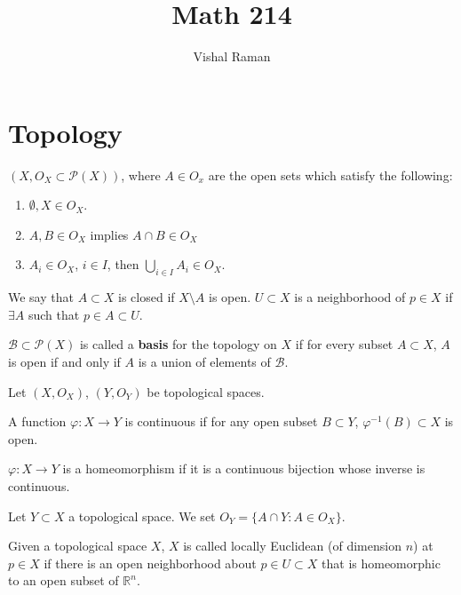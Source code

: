 \documentclass[12pt]{scrartcl}
\newcommand{\R}{\mathbb{R}}
\let \phi \varphi
\let \mc \mathcal
\begin{document}
\title{Math 214}
\author{Vishal Raman}
\maketitle
\tableofcontents
\newpage
\section{Topology}
\begin{definition} $(X, O_X \subset \mc P(X))$, where $A \in O_x$ are the open sets which satisfy the following:
\begin{enumerate}
\item $\emptyset, X \in O_X$.
\item $A, B \in O_X$ implies $A \cap B \in O_X$
\item $A_i \in O_X$, $i \in I$, then $\bigcup_{i \in I} A_i \in O_X$.
\end{enumerate}
We say that $A \subset X$ is closed if $X \setminus A$ is open.  $U \subset X$ is a neighborhood of $p \in X$ if $\exists A$ such that $p \in A \subset U$.
\end{definition}

\begin{definition}  $\mc B \subset \mc P(X)$ is called a \textbf{basis} for the topology on $X$ if for every subset $A \subset X$, $A$ is open if and only if $A$ is a union of elements of $\mc B$.
\end{definition}

Let $(X, O_X)$, $(Y, O_Y)$ be topological spaces.  

\begin{definition} A function $\phi : X \to Y$ is continuous if for any open subset $B \subset Y$, $\phi^{-1}(B) \subset X$ is open.  
\end{definition}

\begin{definition} $\phi: X \to Y$ is a homeomorphism if it is a continuous bijection whose inverse is continuous.  
\end{definition}

\begin{definition} Let $Y \subset X$ a topological space.  We set $O_Y = \{A \cap Y : A \in O_X\}$.
\end{definition}

\begin{definition} Given a topological space $X$, $X$ is called locally Euclidean (of dimension $n$) at $p \in X$ if there is an open neighborhood about $p \in U \subset X$ that is homeomorphic to an open subset of $\R^n$.
\end{definition}
\end{document}
